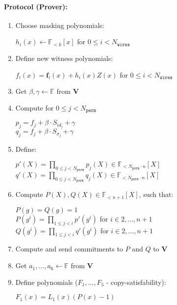 \paragraph{Protocol (Prover):}
\begin{enumerate}
	\item Choose masking polynomials: 
	\begin{center}
		$h_i(x) \leftarrow \mathbb{F}_{<k}[x]$ for $0 \leq i < N_{\texttt{wires}}$
	\end{center}
	\item Define new witness polynomials:
	\begin{center}
		$f_i(x) = \textbf{f}_{i}(x) + h_i(x)Z(x)$ for $0 \leq i < N_{\texttt{wires}}$
	\end{center}
	\item Get $\beta, \gamma \leftarrow \mathbb{F}$ from \textbf{V}
	\item Compute for $0 \leq j < N_{\texttt{perm}}$
	\begin{center}
		$p_j = f_j + \beta \cdot S_{id_j} + \gamma$ \\
		$q_j = f_j + \beta \cdot S_{\sigma_j} + \gamma$
	\end{center}
	\item Define:
	\begin{center}
		$p'(X) = \prod\limits_{0 \leq j < N_{\texttt{perm}}} p_j(X) \in \mathbb{F}_{<N_{\texttt{perm}} \cdot n}[X]$ \\
		$q'(X) = \prod\limits_{0 \leq j < N_{\texttt{perm}}} q_j(X) \in \mathbb{F}_{<N_{\texttt{perm}} \cdot n}[X]$
	\end{center}
	\item Compute $P(X), Q(X) \in \mathbb{F}_{<n+1}[X]$, such that:
	\begin{center}
		$P(g) = Q(g) = 1$ \\
		$P(g^i) = \prod\limits_{1 \leq j < i}p'(g^i)$ for $i \in {2, \dots, n + 1}$ \\
		$Q(g^i) = \prod\limits_{1 \leq j < i}q'(g^i)$ for $i \in {2, \dots, n + 1}$ \\
	\end{center}
	\item Compute and send commitments to $P$ and $Q$ to \textbf{V}
	\item Get $a_1, \dots, a_6 \leftarrow \mathbb{F}$ from \textbf{V}
	\item Define polynomials ($F_1, \dots, F_5$ - copy-satisfability):
	\begin{center}
		$F_1(x) = L_1(x)(P(x) - 1)$\\

\end{center}
\end{enumerate}

